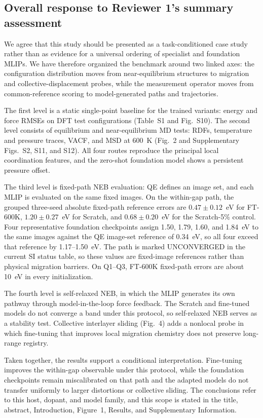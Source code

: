 \documentclass[11pt,a4paper]{article}
\begin{document}
\subsection*{Overall response to Reviewer 1's summary assessment}

We agree that this study should be presented as a task-conditioned case study rather than as evidence for a universal ordering of specialist and foundation MLIPs. We have therefore organized the benchmark around two linked axes: the configuration distribution moves from near-equilibrium structures to migration and collective-displacement probes, while the measurement operator moves from common-reference scoring to model-generated paths and trajectories.

The first level is a static single-point baseline for the trained variants: energy and force RMSEs on DFT test configurations (Table~S1 and Fig.~S10). The second level consists of equilibrium and near-equilibrium MD tests: RDFs, temperature and pressure traces, VACF, and MSD at 600~K (Fig.~2 and Supplementary Figs.~S2, S11, and S12). All four routes reproduce the principal local coordination features, and the zero-shot foundation model shows a persistent pressure offset.

The third level is fixed-path NEB evaluation: QE defines an image set, and each MLIP is evaluated on the same fixed images. On the within-gap path, the grouped three-seed absolute fixed-path reference errors are $0.47\pm0.12$~eV for FT-600K, $1.20\pm0.27$~eV for Scratch, and $0.68\pm0.20$~eV for the Scratch-5\% control. Four representative foundation checkpoints assign 1.50, 1.79, 1.60, and 1.84~eV to the same images against the QE image-set reference of 0.34~eV, so all four exceed that reference by 1.17--1.50~eV. The path is marked UNCONVERGED in the current SI status table, so these values are fixed-image references rather than physical migration barriers. On Q1--Q3, FT-600K fixed-path errors are about 10~eV in every initialization.

The fourth level is self-relaxed NEB, in which the MLIP generates its own pathway through model-in-the-loop force feedback. The Scratch and fine-tuned models do not converge a band under this protocol, so self-relaxed NEB serves as a stability test. Collective interlayer sliding (Fig.~4) adds a nonlocal probe in which fine-tuning that improves local migration chemistry does not preserve long-range registry.

Taken together, the results support a conditional interpretation. Fine-tuning improves the within-gap observable under this protocol, while the foundation checkpoints remain miscalibrated on that path and the adapted models do not transfer uniformly to larger distortions or collective sliding. The conclusions refer to this host, dopant, and model family, and this scope is stated in the title, abstract, Introduction, Figure~1, Results, and Supplementary Information.
\end{document}
